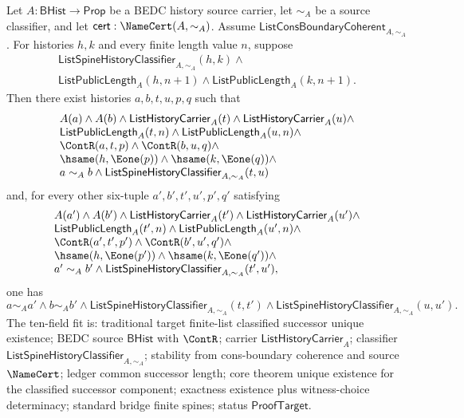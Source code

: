 \begin{theorem}
\label{thm:list-classified-successor-component-unique-existence}
Let $A:\mathsf{BHist}\to\mathsf{Prop}$ be a BEDC history source carrier, let
$\sim_A$ be a source classifier, and let
$\mathsf{cert}:\NameCert(A,\sim_A)$. Assume
$\mathsf{ListConsBoundaryCoherent}_{A,\sim_A}$. For histories $h,k$ and every
finite length value $n$, suppose
$$
\begin{array}{l}
\mathsf{ListSpineHistoryClassifier}_{A,\sim_A}(h,k)\land\\
\mathsf{ListPublicLength}_A(h,n+1)\land
\mathsf{ListPublicLength}_A(k,n+1).
\end{array}
$$
Then there exist histories $a,b,t,u,p,q$ such that
$$
\begin{array}{l}
A(a)\land A(b)\land
\mathsf{ListHistoryCarrier}_A(t)\land
\mathsf{ListHistoryCarrier}_A(u)\land\\
\mathsf{ListPublicLength}_A(t,n)\land
\mathsf{ListPublicLength}_A(u,n)\land\\
\ContR(a,t,p)\land \ContR(b,u,q)\land\\
\hsame(h,\Eone(p))\land \hsame(k,\Eone(q))\land\\
a\sim_A b\land
\mathsf{ListSpineHistoryClassifier}_{A,\sim_A}(t,u)
\end{array}
$$
and, for every other six-tuple $a',b',t',u',p',q'$ satisfying
$$
\begin{array}{l}
A(a')\land A(b')\land
\mathsf{ListHistoryCarrier}_A(t')\land
\mathsf{ListHistoryCarrier}_A(u')\land\\
\mathsf{ListPublicLength}_A(t',n)\land
\mathsf{ListPublicLength}_A(u',n)\land\\
\ContR(a',t',p')\land \ContR(b',u',q')\land\\
\hsame(h,\Eone(p'))\land \hsame(k,\Eone(q'))\land\\
a'\sim_A b'\land
\mathsf{ListSpineHistoryClassifier}_{A,\sim_A}(t',u'),
\end{array}
$$
one has
$$
a\sim_A a'\land b\sim_A b'\land
\mathsf{ListSpineHistoryClassifier}_{A,\sim_A}(t,t')\land
\mathsf{ListSpineHistoryClassifier}_{A,\sim_A}(u,u').
$$
The ten-field fit is: traditional target finite-list classified successor
unique existence; BEDC source $\mathsf{BHist}$ with $\ContR$; carrier
$\mathsf{ListHistoryCarrier}_A$; classifier
$\mathsf{ListSpineHistoryClassifier}_{A,\sim_A}$; stability from
cons-boundary coherence and source $\NameCert$; ledger common successor length;
core theorem unique existence for the classified successor component; exactness
existence plus witness-choice determinacy; standard bridge finite spines;
status $\mathsf{ProofTarget}$.
\end{theorem}
